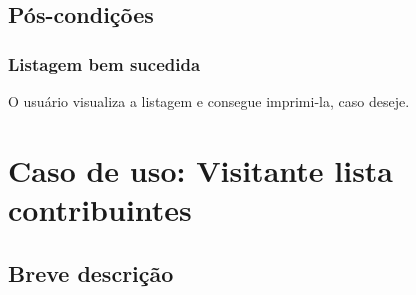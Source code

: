 \documentclass[11pt, a4paper,oneside]{book}
\begin{document}
%
%
%
%

\section{Pós-condições}

\subsection{Listagem bem sucedida}

O usuário visualiza a listagem e consegue imprimi-la, caso deseje.

%

\chapter[Caso de Uso]{Caso de uso: \bf Visitante lista contribuintes}
\label{cap:casodeuso}	

\section{Breve descrição}
\end{document}
